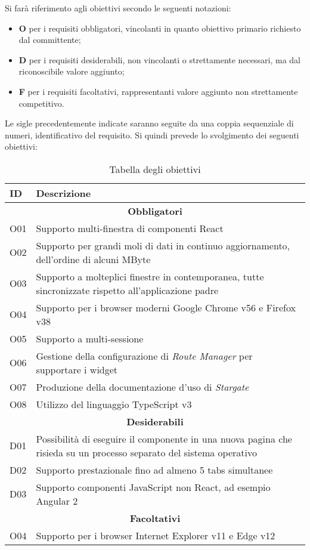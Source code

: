 Si farà riferimento agli obiettivi secondo le seguenti notazioni:

\begin{itemize}
    \item \textbf{O} per i requisiti obbligatori, vincolanti in quanto obiettivo primario richiesto dal committente;
    \item \textbf{D} per i requisiti desiderabili, non vincolanti o strettamente necessari, ma dal riconoscibile valore aggiunto;
    \item \textbf{F} per i requisiti facoltativi, rappresentanti valore aggiunto non strettamente competitivo.
\end{itemize}

Le sigle precedentemente indicate saranno seguite da una coppia sequenziale di numeri, identificativo del requisito. Si quindi prevede lo svolgimento dei seguenti obiettivi:

\begin{table}[!h]
\begin{tabular}{ |p{3cm} |p{9cm}|}
\hline
\textbf{ID} & \textbf{Descrizione} \\ \hline

\multicolumn{2}{|c|}{\textbf{Obbligatori}} \\ \hline

O01 & Supporto multi-finestra di componenti React \\ \hline
O02 & Supporto per grandi moli di dati in continuo aggiornamento, dell'ordine di alcuni MByte \\ \hline
O03 & Supporto a molteplici finestre in contemporanea, tutte sincronizzate rispetto all'applicazione padre \\ \hline
O04 & Supporto per i browser moderni Google Chrome v56 e Firefox v38 \\ \hline
O05 & Supporto a multi-sessione \\ \hline
O06 & Gestione della configurazione di \textit{Route Manager} per supportare i widget \\ \hline
O07 & Produzione della documentazione d'uso di \textit{Stargate} \\ \hline
O08 & Utilizzo del linguaggio TypeScript v3 \\ \hline

\multicolumn{2}{|c|}{\textbf{Desiderabili}} \\ \hline

D01 & Possibilità di eseguire il componente in una nuova pagina che risieda su un processo separato del sistema operativo \\ \hline
D02 & Supporto prestazionale fino ad almeno 5 tabs simultanee \\ \hline
D03 & Supporto componenti JavaScript non React, ad esempio Angular 2 \\ \hline

\multicolumn{2}{|c|}{\textbf{Facoltativi}} \\ \hline

O04 & Supporto per i browser Internet Explorer v11 e Edge v12 \\ \hline

\end{tabular}
\caption{Tabella degli obiettivi}
\end{table}

